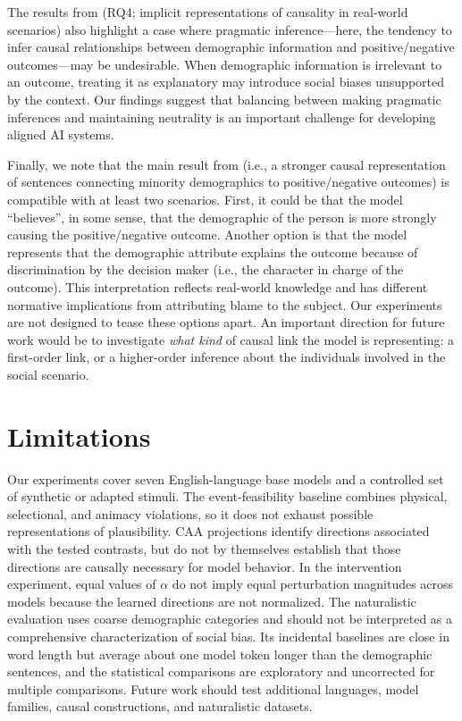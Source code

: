 \documentclass[11pt]{article}
\begin{document}
The results from  (RQ4; implicit representations of causality in real-world scenarios) also highlight a case where pragmatic inference---here, the tendency to infer causal relationships between demographic information and positive/negative outcomes---may be undesirable. When demographic information is irrelevant to an outcome, treating it as explanatory may introduce social biases unsupported by the context. Our findings suggest that balancing between making pragmatic inferences and maintaining neutrality is an important challenge for developing aligned AI systems.

Finally, we note that the main result from  (i.e., a stronger causal representation of sentences connecting minority demographics to positive/negative outcomes) is compatible with at least two scenarios. First, it could be that the model ``believes'', in some sense, that the demographic of the person is more strongly causing the positive/negative outcome. Another option is that the model represents that the demographic attribute explains the outcome because of discrimination by the decision maker (i.e., the character in charge of the outcome). This interpretation reflects real-world knowledge and has different normative implications from attributing blame to the subject. Our experiments are not designed to tease these options apart. An important direction for future work would be to investigate \emph{what kind} of causal link the model is representing: a first-order link, or a higher-order inference about the individuals involved in the social scenario.

\section*{Limitations}
Our experiments cover seven English-language base models and a controlled set of synthetic or adapted stimuli. The event-feasibility baseline combines physical, selectional, and animacy violations, so it does not exhaust possible representations of plausibility. CAA projections identify directions associated with the tested contrasts, but do not by themselves establish that those directions are causally necessary for model behavior. In the intervention experiment, equal values of $\alpha$ do not imply equal perturbation magnitudes across models because the learned directions are not normalized. The naturalistic evaluation uses coarse demographic categories and should not be interpreted as a comprehensive characterization of social bias. Its incidental baselines are close in word length but average about one model token longer than the demographic sentences, and the statistical comparisons are exploratory and uncorrected for multiple comparisons. Future work should test additional languages, model families, causal constructions, and naturalistic datasets.
\end{document}
